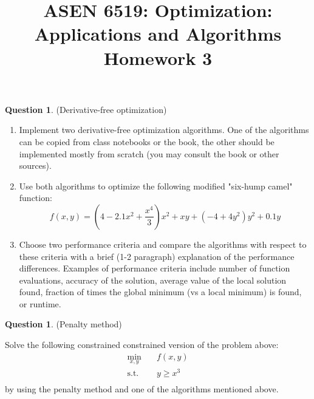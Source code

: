 \documentclass{article}
\title{ASEN 6519: Optimization: Applications and Algorithms\\
       Homework 3}
\theoremstyle{definition}
\newtheorem{question}[thm]{Question}
\begin{document}
\maketitle

\begin{question}(Derivative-free optimization)

    \begin{enumerate}[label=\alph*)]
        \item Implement two derivative-free optimization algorithms. One of the algorithms can be copied from class notebooks or the book, the other should be implemented mostly from scratch (you may consult the book or other sources).
        \item Use both algorithms to optimize the following modified "six-hump camel" function:
        \begin{equation}
            f(x,y) = \left(4 - 2.1x^2 + \frac{x^4}{3}\right)x^2 + xy + \left(-4 + 4y^2\right)y^2 + 0.1y
        \end{equation}
        \item Choose two performance criteria and compare the algorithms with respect to these criteria with a brief (1-2 paragraph) explanation of the performance differences. Examples of performance criteria include number of function evaluations, accuracy of the solution, average value of the local solution found, fraction of times the global minimum (vs a local minimum) is found, or runtime.
    \end{enumerate}
\end{question}

\begin{question}(Penalty method)

    Solve the following constrained constrained version of the problem above:
    \begin{equation}
        \begin{aligned}
            \min_{x,y} \quad & f(x,y) \\
            \text{s.t.} \quad & y \geq x^3 \\
        \end{aligned}
    \end{equation}
    by using the penalty method and one of the algorithms mentioned above.
\end{question}
\end{document}
